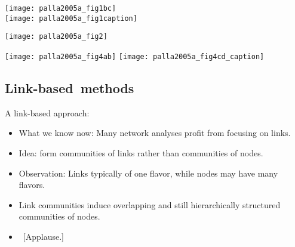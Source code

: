
\begin{frame}
  \begin{center}
  \texttt{[image: palla2005a\_fig1bc]}\\
  \texttt{[image: palla2005a\_fig1caption]}
  \end{center}
\end{frame}

\begin{frame}
  \begin{center}
  \texttt{[image: palla2005a\_fig2]}
  \end{center}
\end{frame}

\begin{frame}
  \texttt{[image: palla2005a\_fig4ab]}
  \texttt{[image: palla2005a\_fig4cd\_caption]}
\end{frame}

\subsection{Link-based\ methods}

\begin{frame}

  \begin{block}{A link-based approach:}
    \begin{itemize}
    \item<+-> 
      What we know now: Many network analyses profit from focusing on links.
    \item<+-> 
      Idea: form communities of links rather than communities
      of nodes.
    \item<+-> 
      Observation: Links typically of one flavor, while
      nodes may have many flavors.
    \item<+-> 
      Link communities induce overlapping and
      still hierarchically structured communities of nodes.
    \item<+-> 
      \ [Applause.]
    \end{itemize}
  \end{block}

\end{frame}


